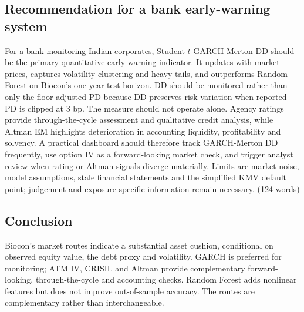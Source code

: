 \documentclass[10pt,a4paper]{article}
\begin{document}
\subsection{Recommendation for a bank early-warning system}
For a bank monitoring Indian corporates, Student-$t$ GARCH-Merton DD should be the primary quantitative early-warning indicator. It updates with market prices, captures volatility clustering and heavy tails, and outperforms Random Forest on Biocon's one-year test horizon. DD should be monitored rather than only the floor-adjusted PD because DD preserves risk variation when reported PD is clipped at 3 bp. The measure should not operate alone. Agency ratings provide through-the-cycle assessment and qualitative credit analysis, while Altman EM highlights deterioration in accounting liquidity, profitability and solvency. A practical dashboard should therefore track GARCH-Merton DD frequently, use option IV as a forward-looking market check, and trigger analyst review when rating or Altman signals diverge materially. Limits are market noise, model assumptions, stale financial statements and the simplified KMV default point; judgement and exposure-specific information remain necessary. (124 words)

\subsection{Conclusion}
Biocon's market routes indicate a substantial asset cushion, conditional on observed equity value, the debt proxy and volatility. GARCH is preferred for monitoring; ATM IV, CRISIL and Altman provide complementary forward-looking, through-the-cycle and accounting checks. Random Forest adds nonlinear features but does not improve out-of-sample accuracy. The routes are complementary rather than interchangeable.

\clearpage
\appendix
\renewcommand{\thepage}{A-\arabic{page}}
\setcounter{page}{1}
\end{document}
